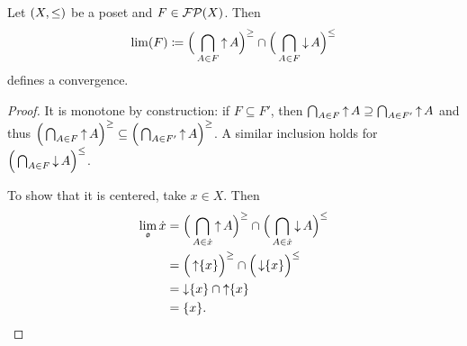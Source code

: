 \begin{lemma} \label{potentialWeakOrderConvergence}
Let $\sSet{X,\leq}$ be a poset and $F\in \operatorname{\mathcal{FP}}(X)$. Then
\[ \lim(F) \coloneqq \Big(\bigcap_{A\in F}\operatorname{\uparrow} A\Big)^\geq \cap \Big(\bigcap_{A\in F}\operatorname{\downarrow} A\Big)^\leq \]
defines a convergence.
\end{lemma}
\begin{proof}
It is monotone by construction: if $F\subseteq F'$, then $\bigcap_{A\in F}\operatorname{\uparrow} A \supseteq \bigcap_{A\in F'}\operatorname{\uparrow} A$ and thus $\Big(\bigcap_{A\in F}\operatorname{\uparrow} A\Big)^\geq \subseteq \Big(\bigcap_{A\in F'}\operatorname{\uparrow} A\Big)^\geq$. A similar inclusion holds for $\Big(\bigcap_{A\in F}\operatorname{\downarrow} A\Big)^\leq$.

To show that it is centered, take $x\in X$. Then
\begin{align*}
\lim_\mathfrak{o}\dot{x} &= \Big(\bigcap_{A\in \dot{x}}\operatorname{\uparrow} A\Big)^\geq \cap \Big(\bigcap_{A\in \dot{x}}\operatorname{\downarrow} A\Big)^\leq \\
&= \Big(\operatorname{\uparrow} \{x\}\Big)^\geq \cap \Big(\operatorname{\downarrow} \{x\}\Big)^\leq \\
&= \operatorname{\downarrow} \{x\} \cap \operatorname{\uparrow} \{x\} \\
&= \{x\}.
\end{align*}
\end{proof}

